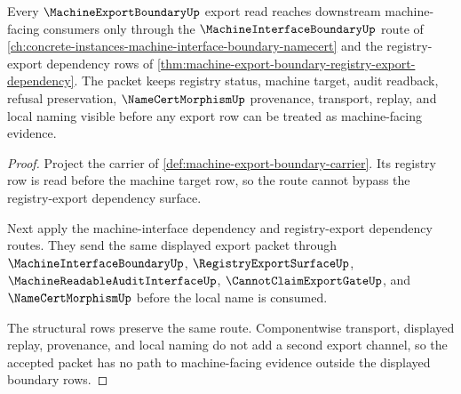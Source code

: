 \begin{theorem}
\label{thm:machine-export-boundary-machine-interface-export-forward-link}
Every $\MachineExportBoundaryUp$ export read reaches downstream machine-facing consumers only through the $\MachineInterfaceBoundaryUp$ route of \autoref{ch:concrete-instances-machine-interface-boundary-namecert} and the registry-export dependency rows of \autoref{thm:machine-export-boundary-registry-export-dependency}. The packet keeps registry status, machine target, audit readback, refusal preservation, $\NameCertMorphismUp$ provenance, transport, replay, and local naming visible before any export row can be treated as machine-facing evidence.
\end{theorem}
\begin{proof}
Project the carrier of \autoref{def:machine-export-boundary-carrier}. Its registry row is read before the machine target row, so the route cannot bypass the registry-export dependency surface.

Next apply the machine-interface dependency and registry-export dependency routes. They send the same displayed export packet through $\MachineInterfaceBoundaryUp$, $\RegistryExportSurfaceUp$, $\MachineReadableAuditInterfaceUp$, $\CannotClaimExportGateUp$, and $\NameCertMorphismUp$ before the local name is consumed.

The structural rows preserve the same route. Componentwise transport, displayed replay, provenance, and local naming do not add a second export channel, so the accepted packet has no path to machine-facing evidence outside the displayed boundary rows.
\end{proof}
